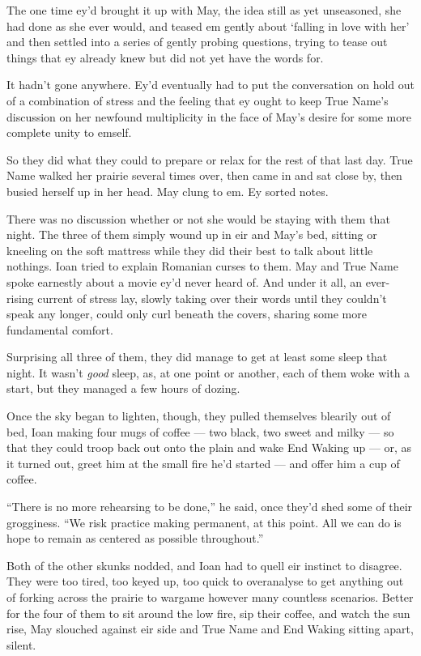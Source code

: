 The one time ey'd brought it up with May, the idea still as yet unseasoned, she had done as she ever would, and teased em gently about `falling in love with her' and then settled into a series of gently probing questions, trying to tease out things that ey already knew but did not yet have the words for.

It hadn't gone anywhere. Ey'd eventually had to put the conversation on hold out of a combination of stress and the feeling that ey ought to keep True Name's discussion on her newfound multiplicity in the face of May's desire for some more complete unity to emself.

So they did what they could to prepare or relax for the rest of that last day. True Name walked her prairie several times over, then came in and sat close by, then busied herself up in her head. May clung to em. Ey sorted notes.

There was no discussion whether or not she would be staying with them that night. The three of them simply wound up in eir and May's bed, sitting or kneeling on the soft mattress while they did their best to talk about little nothings. Ioan tried to explain Romanian curses to them. May and True Name spoke earnestly about a movie ey'd never heard of. And under it all, an ever-rising current of stress lay, slowly taking over their words until they couldn't speak any longer, could only curl beneath the covers, sharing some more fundamental comfort.

Surprising all three of them, they did manage to get at least some sleep that night. It wasn't \emph{good} sleep, as, at one point or another, each of them woke with a start, but they managed a few hours of dozing.

Once the sky began to lighten, though, they pulled themselves blearily out of bed, Ioan making four mugs of coffee — two black, two sweet and milky — so that they could troop back out onto the plain and wake End Waking up — or, as it turned out, greet him at the small fire he'd started — and offer him a cup of coffee.

``There is no more rehearsing to be done,'' he said, once they'd shed some of their grogginess. ``We risk practice making permanent, at this point. All we can do is hope to remain as centered as possible throughout.''

Both of the other skunks nodded, and Ioan had to quell eir instinct to disagree. They were too tired, too keyed up, too quick to overanalyse to get anything out of forking across the prairie to wargame however many countless scenarios. Better for the four of them to sit around the low fire, sip their coffee, and watch the sun rise, May slouched against eir side and True Name and End Waking sitting apart, silent.

